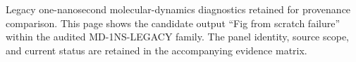 Legacy one-nanosecond molecular-dynamics diagnostics retained for provenance comparison. This page shows the candidate output ``Fig from scratch failure'' within the audited MD-1NS-LEGACY family. The panel identity, source scope, and current status are retained in the accompanying evidence matrix.

